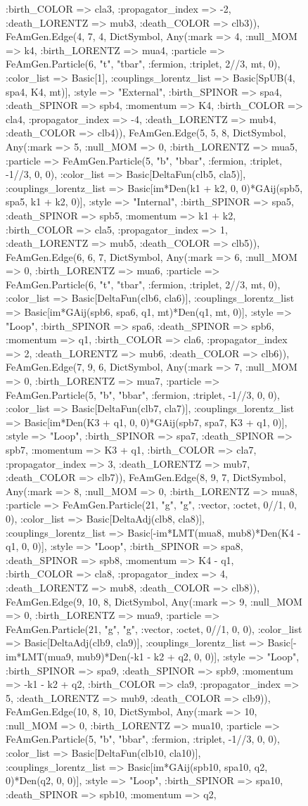\documentclass{revtex4}
\begin{document}
\begin{figure}[!htb]
\begin{center}
{:birth_COLOR => cla3, :propagator_index => -2, :death_LORENTZ => mub3, :death_COLOR => clb3)), FeAmGen.Edge(4, 7, 4, Dict{Symbol, Any}(:mark => 4, :null_MOM => k4, :birth_LORENTZ => mua4, :particle => FeAmGen.Particle(6, "t", "tbar", :fermion, :triplet, 2//3, mt, 0), :color_list => Basic[1], :couplings_lorentz_list => Basic[SpUB(4, spa4, K4, mt)], :style => "External", :birth_SPINOR => spa4, :death_SPINOR => spb4, :momentum => K4, :birth_COLOR => cla4, :propagator_index => -4, :death_LORENTZ => mub4, :death_COLOR => clb4)), FeAmGen.Edge(5, 5, 8, Dict{Symbol, Any}(:mark => 5, :null_MOM => 0, :birth_LORENTZ => mua5, :particle => FeAmGen.Particle(5, "b", "bbar", :fermion, :triplet, -1//3, 0, 0), :color_list => Basic[DeltaFun(clb5, cla5)], :couplings_lorentz_list => Basic[im*Den(k1 + k2, 0, 0)*GAij(spb5, spa5, k1 + k2, 0)], :style => "Internal", :birth_SPINOR => spa5, :death_SPINOR => spb5, :momentum => k1 + k2, :birth_COLOR => cla5, :propagator_index => 1, :death_LORENTZ => mub5, :death_COLOR => clb5)), FeAmGen.Edge(6, 6, 7, Dict{Symbol, Any}(:mark => 6, :null_MOM => 0, :birth_LORENTZ => mua6, :particle => FeAmGen.Particle(6, "t", "tbar", :fermion, :triplet, 2//3, mt, 0), :color_list => Basic[DeltaFun(clb6, cla6)], :couplings_lorentz_list => Basic[im*GAij(spb6, spa6, q1, mt)*Den(q1, mt, 0)], :style => "Loop", :birth_SPINOR => spa6, :death_SPINOR => spb6, :momentum => q1, :birth_COLOR => cla6, :propagator_index => 2, :death_LORENTZ => mub6, :death_COLOR => clb6)), FeAmGen.Edge(7, 9, 6, Dict{Symbol, Any}(:mark => 7, :null_MOM => 0, :birth_LORENTZ => mua7, :particle => FeAmGen.Particle(5, "b", "bbar", :fermion, :triplet, -1//3, 0, 0), :color_list => Basic[DeltaFun(clb7, cla7)], :couplings_lorentz_list => Basic[im*Den(K3 + q1, 0, 0)*GAij(spb7, spa7, K3 + q1, 0)], :style => "Loop", :birth_SPINOR => spa7, :death_SPINOR => spb7, :momentum => K3 + q1, :birth_COLOR => cla7, :propagator_index => 3, :death_LORENTZ => mub7, :death_COLOR => clb7)), FeAmGen.Edge(8, 9, 7, Dict{Symbol, Any}(:mark => 8, :null_MOM => 0, :birth_LORENTZ => mua8, :particle => FeAmGen.Particle(21, "g", "g", :vector, :octet, 0//1, 0, 0), :color_list => Basic[DeltaAdj(clb8, cla8)], :couplings_lorentz_list => Basic[-im*LMT(mua8, mub8)*Den(K4 - q1, 0, 0)], :style => "Loop", :birth_SPINOR => spa8, :death_SPINOR => spb8, :momentum => K4 - q1, :birth_COLOR => cla8, :propagator_index => 4, :death_LORENTZ => mub8, :death_COLOR => clb8)), FeAmGen.Edge(9, 10, 8, Dict{Symbol, Any}(:mark => 9, :null_MOM => 0, :birth_LORENTZ => mua9, :particle => FeAmGen.Particle(21, "g", "g", :vector, :octet, 0//1, 0, 0), :color_list => Basic[DeltaAdj(clb9, cla9)], :couplings_lorentz_list => Basic[-im*LMT(mua9, mub9)*Den(-k1 - k2 + q2, 0, 0)], :style => "Loop", :birth_SPINOR => spa9, :death_SPINOR => spb9, :momentum => -k1 - k2 + q2, :birth_COLOR => cla9, :propagator_index => 5, :death_LORENTZ => mub9, :death_COLOR => clb9)), FeAmGen.Edge(10, 8, 10, Dict{Symbol, Any}(:mark => 10, :null_MOM => 0, :birth_LORENTZ => mua10, :particle => FeAmGen.Particle(5, "b", "bbar", :fermion, :triplet, -1//3, 0, 0), :color_list => Basic[DeltaFun(clb10, cla10)], :couplings_lorentz_list => Basic[im*GAij(spb10, spa10, q2, 0)*Den(q2, 0, 0)], :style => "Loop", :birth_SPINOR => spa10, :death_SPINOR => spb10, :momentum => q2, }
\end{center}
\end{figure}
\end{document}
